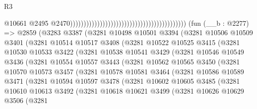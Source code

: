 \begin{lexlean}{R3}
\begin{coremodule}
                                                                                          @10661
                                                                                          @2495
                                                                                          @2470)))))))))))))))))))))))))))))))))))))))))))
    (fun (__b : @2277) =>
    @2859
      (@3283
        @3387
        (@3281
          @10498
          @10501
          @3394
          (@3281
            @10506
            @10509
            @3401
            (@3281
              @10514
              @10517
              @3408
              (@3281
                @10522
                @10525
                @3415
                (@3281
                  @10530
                  @10533
                  @3422
                  (@3281
                    @10538
                    @10541
                    @3429
                    (@3281
                      @10546
                      @10549
                      @3436
                      (@3281
                        @10554
                        @10557
                        @3443
                        (@3281
                          @10562
                          @10565
                          @3450
                          (@3281
                            @10570
                            @10573
                            @3457
                            (@3281
                              @10578
                              @10581
                              @3464
                              (@3281
                                @10586
                                @10589
                                @3471
                                (@3281
                                  @10594
                                  @10597
                                  @3478
                                  (@3281
                                    @10602
                                    @10605
                                    @3485
                                    (@3281
                                      @10610
                                      @10613
                                      @3492
                                      (@3281
                                        @10618
                                        @10621
                                        @3499
                                        (@3281
                                          @10626
                                          @10629
                                          @3506
                                          (@3281

\end{coremodule}
\end{lexlean}
